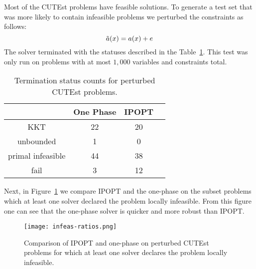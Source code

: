 \documentclass{article}
\begin{document}
Most of the CUTEst problems have feasible solutions. To generate a test set that was more likely to contain infeasible problems we perturbed the constraints as follows:
$$
\tilde{a}(x) = a(x) + e
$$
The solver terminated with the statuses described in the Table~\ref{tbl:termination-status-counts-peturbed}. This test was only run on problems with at most $1,000$ variables and constraints total.
\begin{table}[H]
\caption{Termination status counts for perturbed CUTEst problems.}\label{tbl:termination-status-counts-peturbed}
\begin{tabular}{ c c c r }
 &  One Phase &  IPOPT &  \\
  \hline
KKT & 22 & 20 \\
unbounded & 1 & 0  \\
primal infeasible & 44 &  38 \\
fail & 3 & 12 \\
\end{tabular}
\end{table}

Next, in Figure~\ref{fig:comparison-IPOPT-on-perturbed-CUTEst} we compare IPOPT and the one-phase on the subset problems which at least one solver declared the problem locally infeasible. From this figure one can see that the one-phase solver is quicker and more robust than IPOPT.

\begin{figure}[H]
\texttt{[image: infeas-ratios.png]}
\caption{Comparison of IPOPT and one-phase on perturbed CUTEst problems for which at least one solver declares the problem locally infeasible.}\label{fig:comparison-IPOPT-on-perturbed-CUTEst}
\end{figure}

%
%
%
%
\end{document}
